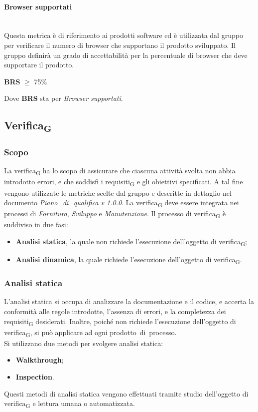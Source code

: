 \paragraph{Browser supportati}\mbox{}\\
Questa metrica è di riferimento ai prodotti software ed è utilizzata dal gruppo per verificare il numero di browser che supportano il prodotto sviluppato. Il gruppo definirà un grado di accettabilità per la percentuale di browser che deve supportare il prodotto.
\begin{center}
	\textbf{BRS} $\geq$ 75\%
\end{center}
Dove \textbf{BRS} sta per \textit{Browser supportati}.

\subsection{Verifica\textsubscript{G}}
\subsubsection{Scopo}
La verifica\textsubscript{G} ha lo scopo di assicurare che ciascuna attività svolta non abbia introdotto errori, e che soddisfi i requisiti\textsubscript{G} e gli obiettivi specificati. A tal fine vengono utilizzate le metriche scelte dal gruppo e descritte in dettaglio nel documento \textit{Piano\_di\_qualifica v 1.0.0}.
La verifica\textsubscript{G} deve essere integrata nei processi di \textit{Fornitura}, \textit{Sviluppo} e \textit{Manutenzione}.
\newline
\newline
Il processo di verifica\textsubscript{G} è suddiviso in due fasi:
\begin{itemize}
	\item \textbf{Analisi statica}, la quale non richiede l'esecuzione dell'oggetto di verifica\textsubscript{G};
	\item \textbf{Analisi dinamica}, la quale richiede l'esecuzione dell'oggetto di verifica\textsubscript{G}.
\end{itemize}

\subsubsection{Analisi statica}
L’analisi statica si occupa di analizzare la documentazione e il codice, e accerta la conformità alle regole introdotte, l'assenza di errori, e la completezza dei requisiti\textsubscript{G} desiderati. Inoltre, poiché non richiede l’esecuzione dell’oggetto di verifica\textsubscript{G}, si può applicare ad ogni prodotto di processo.\\
Si utilizzano due metodi per svolgere analisi statica:
\begin{itemize}
	\item \textbf{Walkthrough};
	\item \textbf{Inspection}.
\end{itemize}
Questi metodi di analisi statica vengono effettuati tramite studio dell’oggetto di verifica\textsubscript{G} e lettura umana o automatizzata.
